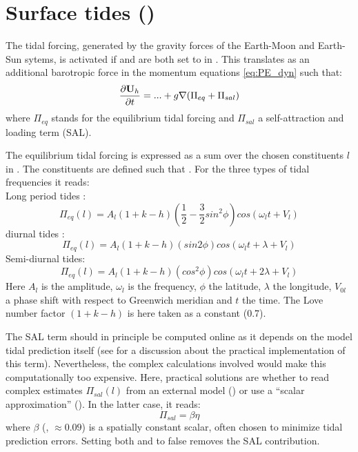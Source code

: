 \documentclass[../tex_main/NEMO_manual]{subfiles}
\begin{document}
\section{Surface tides (\protect{})}
\label{sec:SBC_tide}



The tidal forcing, generated by the gravity forces of the Earth-Moon and Earth-Sun sytems,
is activated if  and  are both set to  in .
This translates as an additional barotropic force in the momentum equations \ref{eq:PE_dyn} such that:
\begin{equation}     \label{eq:PE_dyn_tides}
\frac{\partial {\rm {\bf U}}_h }{\partial t}= ...
+g\nabla (\Pi_{eq} + \Pi_{sal}) 
\end{equation} 
where $\Pi_{eq}$ stands for the equilibrium tidal forcing and $\Pi_{sal}$ a self-attraction and loading term (SAL). 
 
The equilibrium tidal forcing is expressed as a sum over the chosen constituents $l$ in .
The constituents are defined such that .
For the three types of tidal frequencies it reads: \\
Long period tides :
\begin{equation}
\Pi_{eq}(l)=A_{l}(1+k-h)(\frac{1}{2}-\frac{3}{2}sin^{2}\phi)cos(\omega_{l}t+V_{l})
\end{equation}
diurnal tides :
\begin{equation}
\Pi_{eq}(l)=A_{l}(1+k-h)(sin 2\phi)cos(\omega_{l}t+\lambda+V_{l})
\end{equation}
Semi-diurnal tides:
\begin{equation}
\Pi_{eq}(l)=A_{l}(1+k-h)(cos^{2}\phi)cos(\omega_{l}t+2\lambda+V_{l})
\end{equation}
Here $A_{l}$ is the amplitude, $\omega_{l}$ is the frequency, $\phi$ the latitude, $\lambda$ the longitude,
$V_{0l}$ a phase shift with respect to Greenwich meridian and $t$ the time.
The Love number factor $(1+k-h)$ is here taken as a constant (0.7).

The SAL term should in principle be computed online as it depends on the model tidal prediction itself
(see \citet{Arbic2004} for a discussion about the practical implementation of this term).
Nevertheless, the complex calculations involved would make this computationally too expensive.
Here, practical solutions are whether to read complex estimates $\Pi_{sal}(l)$ from an external model
() or use a ``scalar approximation'' ().
In the latter case, it reads:\\
\begin{equation}
\Pi_{sal} = \beta \eta
\end{equation}
where $\beta$ (, $\approx0.09$) is a spatially constant scalar,
often chosen to minimize tidal prediction errors.
Setting both  and  to false removes the SAL contribution.
\end{document}
